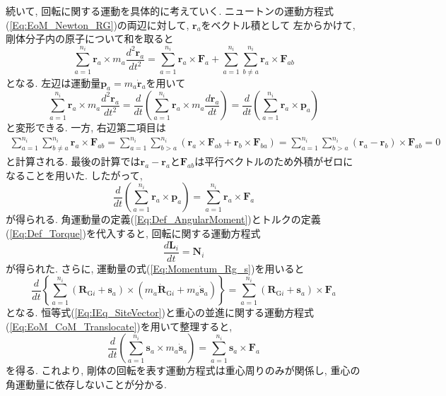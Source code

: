 続いて, 回転に関する運動を具体的に考えていく.
ニュートンの運動方程式(\ref{Eq:EoM_Newton_RG})の両辺に対して, $\bm{r}_{a}$をベクトル積として 左からかけて, 剛体分子内の原子について和を取ると
\begin{equation}
  \sum_{a=1}^{n_{i}} \bm{r}_{a} \times m_{a} \frac{d^{2} \bm{r}_{a}}{dt^{2}}
  =
  \sum_{a=1}^{n_{i}} \bm{r}_{a} \times \bm{F}_{a}
  +
  \sum_{a=1}^{n_{i}} \sum_{b \neq a}^{n_{i}} \bm{r}_{a} \times \bm{F}_{ab}
\end{equation}
となる. 左辺は運動量$\bm{p}_{a} = m_{a} \dot{\bm{r}}_{a}$を用いて
\begin{equation}
  \sum_{a=1}^{n_{i}} \bm{r}_{a} \times m_{a} \frac{d^{2} \bm{r}_{a}}{dt^{2}}
  =
  \frac{d}{dt}
  \left(
    \sum_{a=1}^{n_{i}} \bm{r}_{a} \times m_{a} \frac{d \bm{r}_{a}}{dt}
  \right)
  =
  \frac{d}{dt}
  \left(
    \sum_{a=1}^{n_{i}} \bm{r}_{a} \times \bm{p}_{a}
  \right)
\end{equation}
と変形できる. 一方, 右辺第二項目は
\begin{align}
  \sum_{a=1}^{n_{i}} \sum_{b \neq a}^{n_{i}} \bm{r}_{a} \times \bm{F}_{ab}
  =
  \sum_{a=1}^{n_{i}} \sum_{b > a}^{n_{i}}
  \left(
    \bm{r}_{a} \times \bm{F}_{ab}
    +
    \bm{r}_{b} \times \bm{F}_{ba}
  \right)
  =
  \sum_{a=1}^{n_{i}} \sum_{b > a}^{n_{i}}
  \left(
    \bm{r}_{a} - \bm{r}_{b}
  \right)
  \times \bm{F}_{ab}
  =0
\end{align}
と計算される. 最後の計算では$\bm{r}_{a} - \bm{r}_{a}$と$\bm{F}_{ab}$は平行ベクトルのため外積がゼロになることを用いた. したがって, 
\begin{equation}
  \frac{d}{dt}
  \left(
    \sum_{a=1}^{n_{i}} \bm{r}_{a} \times \bm{p}_{a}
  \right)
  =
  \sum_{a=1}^{n_{i}} \bm{r}_{a} \times \bm{F}_{a}
\end{equation}
が得られる. 角運動量の定義(\ref{Eq:Def_AngularMoment})とトルクの定義(\ref{Eq:Def_Torque})を代入すると, 回転に関する運動方程式
\begin{equation}
  \frac{d \bm{L}_{i}}{dt} = \bm{N}_{i}
\end{equation}
が得られた.
さらに, 運動量の式(\ref{Eq:Momentum_Rg_s})を用いると
\begin{equation}
  \frac{d}{dt}
  \left\{
    \sum_{a=1}^{n_{i}}
    \left(\bm{R}_{\mathrm{G}i} + \bm{s}_{a}\right)
    \times
    \left(m_{a} \dot{\bm{R}}_{\mathrm{G}i} + m_{a}\dot{\bm{s}}_{a}\right)
  \right\}
  =
  \sum_{a=1}^{n_{i}}
  \left(\bm{R}_{\mathrm{G}i} + \bm{s}_{a}\right)
  \times
  \bm{F}_{a}
\end{equation}
となる.
恒等式(\ref{Eq:IEq_SiteVector})と重心の並進に関する運動方程式(\ref{Eq:EoM_CoM_Translocate})を用いて整理すると,
\begin{equation}
  \frac{d}{dt}
  \left(
    \sum_{a=1}^{n_{i}}
    \bm{s}_{a} \times m_{a} \dot{\bm{s}}_{a}
  \right)
  =
  \sum_{a=1}^{n_{i}}
  \bm{s}_{a} \times \bm{F}_{a}
\end{equation}
を得る. これより, 剛体の回転を表す運動方程式は重心周りのみが関係し, 重心の角運動量に依存しないことが分かる.



